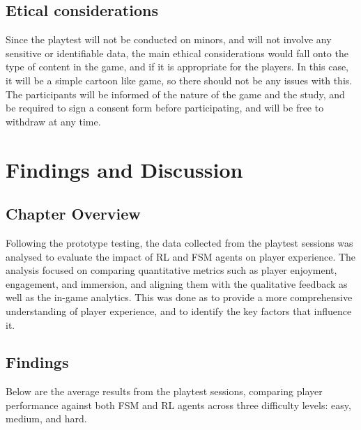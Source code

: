 \documentclass[conference]{IEEEtran}
\begin{document}
\subsection{Etical considerations}

Since the playtest will not be conducted on minors, and will not involve any sensitive or identifiable data, the main ethical considerations
would fall onto the type of content in the game, and if it is appropriate for the players. In this case, it will be a simple cartoon like game,
so there should not be any issues with this. The participants will be informed of the nature of the game and the study, and be required to
sign a consent form before participating, and will be free to withdraw at any time.

\section{Findings and Discussion}

\subsection{Chapter Overview}
Following the prototype testing, the data collected from the playtest sessions was analysed to evaluate the impact of RL and FSM agents on player experience.
The analysis focused on comparing quantitative metrics such as player enjoyment, engagement, and immersion, and aligning them with the qualitative feedback as well as the in-game analytics.
This was done as to provide a more comprehensive understanding of player experience, and to identify the key factors that influence it.

\subsection{Findings}

Below are the average results from the playtest sessions, comparing player performance against both FSM and RL agents across three difficulty levels: easy, medium, and hard.
\end{document}
